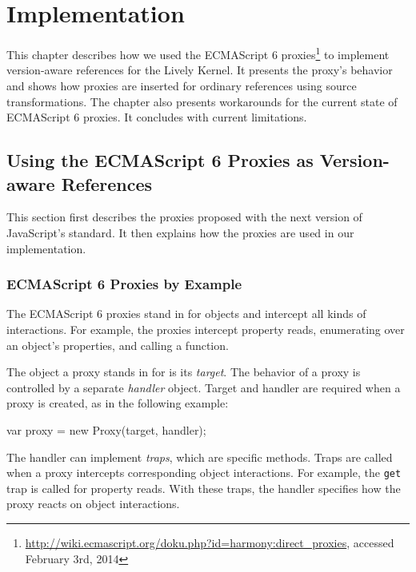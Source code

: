 \chapter{Implementation} \label{chapter:IMPLEMENTATION}

This chapter describes how we used the ECMAScript 6 proxies\footnote{\url{http://wiki.ecmascript.org/doku.php?id=harmony:direct_proxies}, accessed February 3rd, 2014} to implement version-aware references for the Lively Kernel.
It presents the proxy's behavior and shows how proxies are inserted for ordinary references using source transformations.
The chapter also presents workarounds for the current state of ECMAScript 6 proxies.
It concludes with current limitations.

\section{Using the ECMAScript 6 Proxies as Version-aware References} \label{sec:IMPLEMENTATION:1}

This section first describes the proxies proposed with the next version of JavaScript's standard.
It then explains how the proxies are used in our implementation.

\subsection{ECMAScript 6 Proxies by Example} \label{subsec:IMPLEMENTATION:1.1}

The ECMAScript 6 proxies stand in for objects and intercept all kinds of interactions.
For example, the proxies intercept property reads, enumerating over an object's properties, and calling a function.

The object a proxy stands in for is its \emph{target}.
The behavior of a proxy is controlled by a separate \emph{handler} object.
Target and handler are required when a proxy is created, as in the following example:

\begin{code}{}{}
var proxy = new Proxy(target, handler);
\end{code}
\iffalse
\end{verbatim}\fi

The handler can implement \emph{traps}, which are specific methods.
Traps are called when a proxy intercepts corresponding object interactions.
For example, the \lstinline{get} trap is called for property reads.
With these traps, the handler specifies how the proxy reacts on object interactions.

